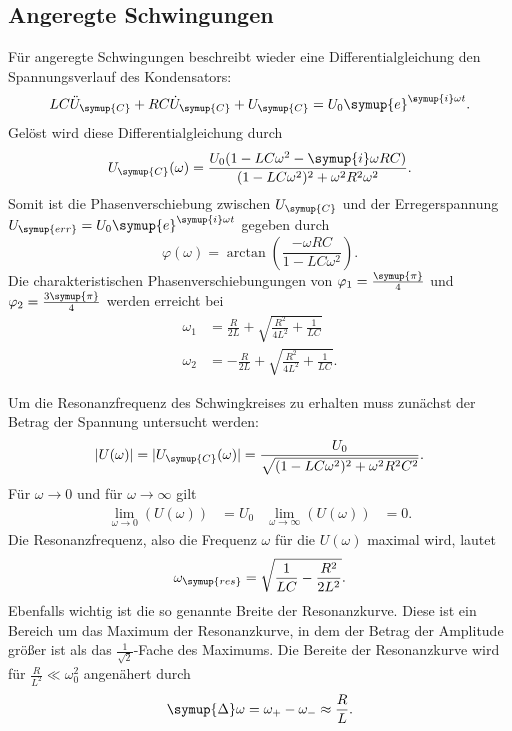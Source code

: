 \subsection{Angeregte Schwingungen}
Für angeregte Schwingungen beschreibt wieder eine Differentialgleichung den Spannungsverlauf des Kondensators:
\begin{equation*}
    LC\ddot{U}_{\symup{C}}+RC\dot{U}_{\symup{C}}+U_{\symup{C}} = U_0\symup{e}^{\symup{i}\omega t}.
\end{equation*}
Gelöst wird diese Differentialgleichung durch
\begin{equation*}
    U_{\symup{C}}(\omega)=\frac{U_0(1-LC\omega^2-\symup{i}\omega RC)}{(1-LC\omega^2)^{2}+\omega^2R^2\omega^2}.
\end{equation*}
Somit ist die Phasenverschiebung zwischen $U_{\symup{C}}$ und der Erregerspannung~$U_{\symup{err}}=U_0\symup{e}^{\symup{i}\omega t}$
gegeben durch
\begin{equation}
    \varphi(\omega)=\arctan\left(\frac{-\omega RC}{1-LC\omega^2}\right).
    \label{eq:Phasenverschiebung}
\end{equation}
Die charakteristischen Phasenverschiebungungen von $\varphi_1 = \frac{\symup{\pi}}{4}$ und $\varphi_2 = \frac{3\symup{\pi}}{4}$ werden erreicht bei
\begin{align}
    \omega_1&=\frac{R}{2L}+\sqrt{\frac{R^2}{4L^2}+\frac{1}{LC}} \label{eq:omega 1} \\
    \omega_2&=-\frac{R}{2L}+\sqrt{\frac{R^2}{4L^2}+\frac{1}{LC}}. \label{eq:omega 2}
\end{align}

Um die Resonanzfrequenz des Schwingkreises zu erhalten muss zunächst der Betrag der Spannung untersucht werden:
\begin{equation}
    |U(\omega)|=|U_{\symup{C}}(\omega)| = \frac{U_0}{\sqrt{(1-LC\omega^2)^2+\omega^2R^2C^2}}.
    \label{eq:Spannung}
\end{equation}
Für $\omega \to 0$ und für $\omega \to \infty$ gilt
\begin{align*}
    \lim \limits_{\omega \to 0} (U(\omega)) &= U_0 & \lim \limits_{\omega \to \infty} (U(\omega)) &= 0.
\end{align*}
Die Resonanzfrequenz, also die Frequenz $\omega$ für die $U(\omega)$ maximal wird, lautet
\begin{equation}
    \omega_{\symup{res}} = \sqrt{\frac{1}{LC}-\frac{R^2}{2L^2}}.
    \label{eq:Resonanzfrequenz}
\end{equation}
Ebenfalls wichtig ist die so genannte Breite der Resonanzkurve. Diese ist ein Bereich um das Maximum der Resonanzkurve,
in dem der Betrag der Amplitude größer ist als das $\frac{1}{\sqrt{2}}$-Fache des Maximums. Die Bereite der Resonanzkurve
wird für $\frac{R}{L^2} \ll \omega_0^2$ angenähert durch
\begin{equation}
    \symup{\Delta}\omega = \omega_{+}-\omega_{-} \approx \frac{R}{L}.
    \label{eq:Breite Resonanzkurve}
\end{equation}


